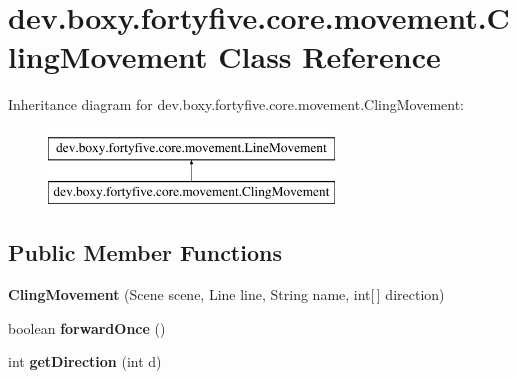 \hypertarget{classdev_1_1boxy_1_1fortyfive_1_1core_1_1movement_1_1_cling_movement}{
\section{dev.boxy.fortyfive.core.movement.ClingMovement Class Reference}
\label{d5/dc6/classdev_1_1boxy_1_1fortyfive_1_1core_1_1movement_1_1_cling_movement}
}
Inheritance diagram for dev.boxy.fortyfive.core.movement.ClingMovement:\begin{figure}[H]
\begin{center}
\leavevmode
\includegraphics[height=2.000000cm]{d5/dc6/classdev_1_1boxy_1_1fortyfive_1_1core_1_1movement_1_1_cling_movement}
\end{center}
\end{figure}
\subsection*{Public Member Functions}
\begin{DoxyCompactItemize}
\item 
\hypertarget{classdev_1_1boxy_1_1fortyfive_1_1core_1_1movement_1_1_cling_movement_ac477930ca183940fdbb5ba598bc986a5}{
{\bfseries ClingMovement} (Scene scene, Line line, String name, int\mbox{[}$\,$\mbox{]} direction)}
\label{d5/dc6/classdev_1_1boxy_1_1fortyfive_1_1core_1_1movement_1_1_cling_movement_ac477930ca183940fdbb5ba598bc986a5}

\item 
\hypertarget{classdev_1_1boxy_1_1fortyfive_1_1core_1_1movement_1_1_cling_movement_a537e2e721d4b74711bf2558da2d5a721}{
boolean {\bfseries forwardOnce} ()}
\label{d5/dc6/classdev_1_1boxy_1_1fortyfive_1_1core_1_1movement_1_1_cling_movement_a537e2e721d4b74711bf2558da2d5a721}

\item 
\hypertarget{classdev_1_1boxy_1_1fortyfive_1_1core_1_1movement_1_1_cling_movement_a19f4587904b7b4b1dc3a339b3f1295b0}{
int {\bfseries getDirection} (int d)}
\label{d5/dc6/classdev_1_1boxy_1_1fortyfive_1_1core_1_1movement_1_1_cling_movement_a19f4587904b7b4b1dc3a339b3f1295b0}

\end{DoxyCompactItemize}

